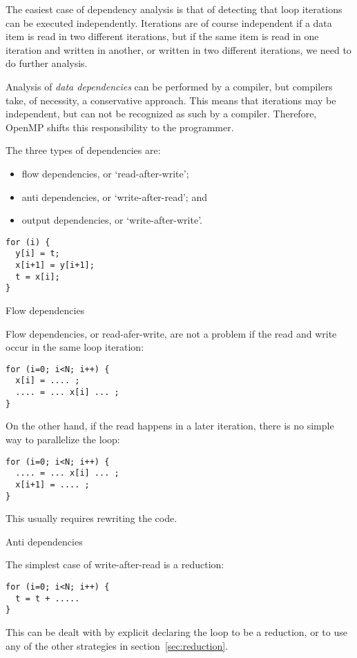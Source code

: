 The easiest case of dependency analysis is that of
detecting that loop iterations can be executed independently.
Iterations are of course independent if a data item
is read in two different iterations, but if the same
item is read in one iteration and written in another,
or written in two different iterations,
we need to do further analysis.

Analysis of \emph{data dependencies} can be performed
by a compiler, but compilers take, of necessity,
a conservative approach. This means that iterations
may be independent, but can not be recognized as such by
a compiler. Therefore, OpenMP shifts this responsibility
to the programmer.

The three types of dependencies are:
\begin{itemize}
\item flow dependencies, or `read-after-write';
\item anti dependencies, or `write-after-read'; and
\item output dependencies, or `write-after-write'.
\end{itemize}

\begin{verbatim}
for (i) {
  y[i] = t;
  x[i+1] = y[i+1];
  t = x[i];
}
\end{verbatim}

 {Flow dependencies}

Flow dependencies, or read-afer-write,
are not a problem if the read and write occur in the same
loop iteration:
\begin{verbatim}
for (i=0; i<N; i++) {
  x[i] = .... ;
  .... = ... x[i] ... ;
}
\end{verbatim}
On the other hand, if the read happens in a later iteration,
there is no simple way to parallelize the loop:
\begin{verbatim}
for (i=0; i<N; i++) {
  .... = ... x[i] ... ;
  x[i+1] = .... ;
}
\end{verbatim}
This usually requires rewriting the code.

 {Anti dependencies}

The simplest case of write-after-read is a reduction:
\begin{verbatim}
for (i=0; i<N; i++) {
  t = t + .....
}
\end{verbatim}
This can be dealt with by explicit declaring the loop to be a reduction,
or to use any of the other strategies in section~\ref{sec:reduction}.


